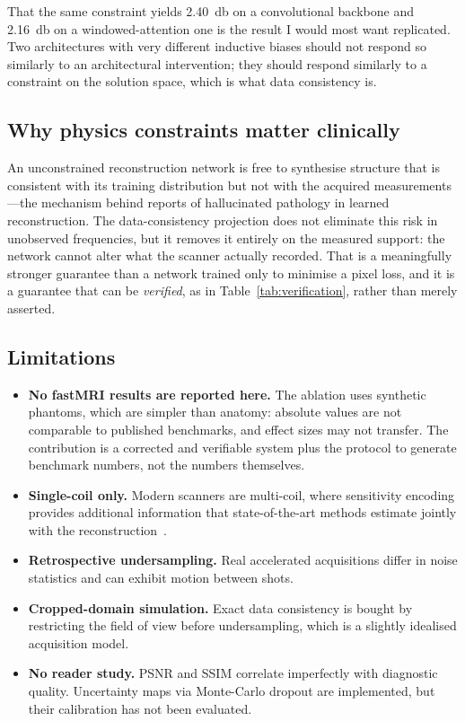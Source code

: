 \documentclass[11pt]{article}
\begin{document}
That the same constraint yields \SI{+2.40}{\decibel} on a convolutional
backbone and \SI{+2.16}{\decibel} on a windowed-attention one is the result I
would most want replicated. Two architectures with very different inductive
biases should not respond so similarly to an architectural intervention; they
should respond similarly to a constraint on the solution space, which is what
data consistency is.

\subsection{Why physics constraints matter clinically}

An unconstrained reconstruction network is free to synthesise structure that is
consistent with its training distribution but not with the acquired
measurements---the mechanism behind reports of hallucinated pathology in learned
reconstruction. The data-consistency projection does not eliminate this risk in
unobserved frequencies, but it removes it entirely on the measured support: the
network cannot alter what the scanner actually recorded. That is a meaningfully
stronger guarantee than a network trained only to minimise a pixel loss, and it
is a guarantee that can be \emph{verified}, as in
Table~\ref{tab:verification}, rather than merely asserted.

\subsection{Limitations}

\begin{itemize}
  \item \textbf{No fastMRI results are reported here.} The ablation uses
        synthetic phantoms, which are simpler than anatomy: absolute values are
        not comparable to published benchmarks, and effect sizes may not
        transfer. The contribution is a corrected and verifiable system plus the
        protocol to generate benchmark numbers, not the numbers themselves.
  \item \textbf{Single-coil only.} Modern scanners are multi-coil, where
        sensitivity encoding provides additional information that
        state-of-the-art methods estimate jointly with the
        reconstruction~\cite{sriram2020}.
  \item \textbf{Retrospective undersampling.} Real accelerated acquisitions
        differ in noise statistics and can exhibit motion between shots.
  \item \textbf{Cropped-domain simulation.} Exact data consistency is bought by
        restricting the field of view before undersampling, which is a slightly
        idealised acquisition model.
  \item \textbf{No reader study.} PSNR and SSIM correlate imperfectly with
        diagnostic quality. Uncertainty maps via Monte-Carlo dropout are
        implemented, but their calibration has not been evaluated.
\end{itemize}
\end{document}
